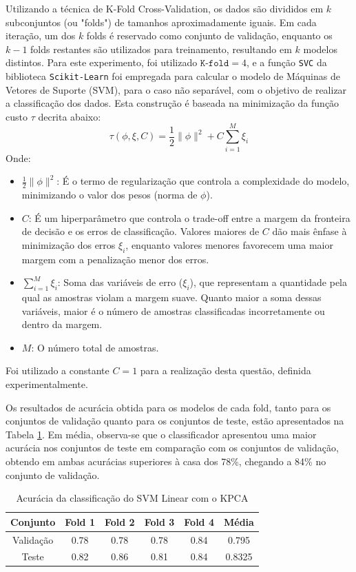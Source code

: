 \documentclass[]{abntex2}
\begin{document}
Utilizando a técnica de K-Fold Cross-Validation, os dados são divididos em \( k \) subconjuntos (ou "folds") de tamanhos aproximadamente iguais. Em cada iteração, um dos \( k \) folds é reservado como conjunto de validação, enquanto os \( k-1 \) folds restantes são utilizados para treinamento, resultando em \( k \) modelos distintos. Para este experimento, foi utilizado \( \texttt{K-fold} = 4 \), e a função \texttt{SVC} da biblioteca \texttt{Scikit-Learn} foi empregada para calcular o modelo de Máquinas de Vetores de Suporte (SVM), para o caso não separável, com o objetivo de realizar a classificação dos dados. Esta construção é baseada na minimização da função custo $\tau$ decrita abaixo:
\[
\tau(\phi, \xi, C) = \frac{1}{2} \|\phi\|^2 + C \sum_{i=1}^{M} \xi_i
\]
Onde:
\begin{itemize}
    \item \(\frac{1}{2} \|\phi\|^2\): É o termo de regularização que controla a complexidade do modelo, minimizando o valor dos pesos (norma de \(\phi\)).
    \item \(C\): É um hiperparâmetro que controla o trade-off entre a margem da fronteira de decisão e os erros de classificação. Valores maiores de \(C\) dão mais ênfase à minimização dos erros \(\xi_i\), enquanto valores menores favorecem uma maior margem com a penalização menor dos erros.
    \item \(\sum_{i=1}^{M} \xi_i\): Soma das variáveis de erro (\(\xi_i\)), que representam a quantidade pela qual as amostras violam a margem suave. Quanto maior a soma dessas variáveis, maior é o número de amostras classificadas incorretamente ou dentro da margem.
    \item \(M\): O número total de amostras.
\end{itemize}

Foi utilizado a constante $C=1$ para a realização desta questão, definida experimentalmente.

Os resultados de acurácia obtida para os modelos de cada fold, tanto para os conjuntos de validação quanto para os conjuntos de teste, estão apresentados na Tabela \ref{tab:kpca_svm}. Em média, observa-se que o classificador apresentou uma maior acurácia nos conjuntos de teste em comparação com os conjuntos de validação, obtendo em ambas acurácias superiores à casa dos 78\%, chegando a 84\% no conjunto de validação.

\begin{table}[H]
    \centering
    \begin{tabular}{|c|c|c|c|c|c|}
    \hline
    \rowcolor[HTML]{C0C0C0} 
    Conjunto                          & Fold 1 & Fold 2 & Fold 3 & Fold 4 & Média  \\ \hline
    \cellcolor[HTML]{C0C0C0}Validação & 0.78   & 0.78   & 0.78   & 0.84   & 0.795  \\ \hline
    \cellcolor[HTML]{C0C0C0}Teste     & 0.82   & 0.86   & 0.81   & 0.84   & 0.8325 \\ \hline
    \end{tabular}
    \caption{Acurácia da classificação do SVM Linear com o KPCA}
    \label{tab:kpca_svm}
\end{table}
\end{document}
